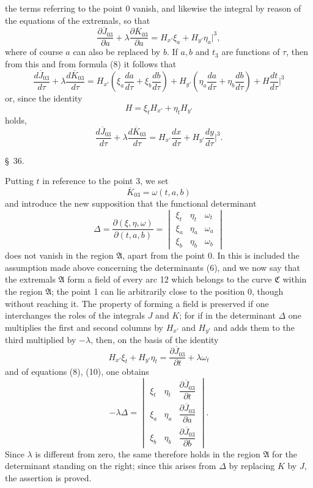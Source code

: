 \documentclass[11pt,a4paper,leqno]{article}
\begin{document}
the terms referring to the point 0 vanish, and likewise the integral by reason of the equations of the extremals, so that
\begin{equation}\tag{10}
\frac{\partial\overline{J}_{03}}{\partial a}+\lambda\frac{\partial\overline{K}_{03}}{\partial a}
=H_{x'}\xi_a+H_{y'}\eta_a\bigg|^3,
\end{equation}
where of course $a$ can also be replaced by $b$. If $a,b$ and $t_3$ are functions of $\tau$, then from this and from formula (8) it follows that
\[
\frac{d\overline{J}_{03}}{d\tau}+\lambda\frac{d\overline{K}_{03}}{d\tau}
=H_{x'}\left(\xi_a\frac{da}{d\tau}+\xi_b\frac{db}{d\tau}\right)
+H_{y'}\left(\eta_a\frac{da}{d\tau}+\eta_b\frac{db}{d\tau}\right)+H\frac{dt}{d\tau}\bigg|^3
\]
or, since the identity
\[
H=\xi_tH_{x'}+\eta_tH_{y'}
\]
holds,
\begin{equation}\tag{11}
\frac{d\overline{J}_{03}}{d\tau}+\lambda\frac{d\overline{K}_{03}}{d\tau}
=H_{x'}\frac{dx}{d\tau}+H_{y'}\frac{dy}{d\tau}\bigg|^3.
\end{equation}

\begin{center}{\large \S~36.}\end{center}

Putting $t$ in reference to the point 3, we set
\[
\overline{K}_{03}=\omega(t,a,b)
\]
and introduce the new supposition that the functional determinant
\begingroup
\setlength{\arraycolsep}{1pt}
\[
\Delta=\frac{\partial(\xi,\eta,\omega)}{\partial(t,a,b)}=
\begin{vmatrix}
\xi_t&\eta_t&\omega_t\\
\xi_a&\eta_a&\omega_a\\
\xi_b&\eta_b&\omega_b
\end{vmatrix}
\]
does not vanish in the region $\mathfrak{A}$, apart from the point 0. In this is included the assumption made above concerning the determinants (6), and we now say that the extremals $\mathfrak{A}$ form a field of every arc 12 which belongs to the curve $\mathfrak{C}$ within the region $\mathfrak{A}$; the point 1 can lie arbitrarily close to the position 0, though without reaching it. The property of forming a field is preserved if one interchanges the roles of the integrals $J$ and $K$; for if in the determinant $\Delta$ one multiplies the first and second columns by $H_{x'}$ and $H_{y'}$ and adds them to the third multiplied by $-\lambda$, then, on the basis of the identity
\[
H_{x'}\xi_t+H_{y'}\eta_t=\frac{\partial\overline{J}_{03}}{\partial t}+\lambda\omega_t
\]
and of equations (8), (10), one obtains
\[
-\lambda\Delta=
\begin{vmatrix}
\xi_t&\eta_t&\dfrac{\partial\overline{J}_{03}}{\partial t}\\[1.2ex]
\xi_a&\eta_a&\dfrac{\partial\overline{J}_{03}}{\partial a}\\[1.2ex]
\xi_b&\eta_b&\dfrac{\partial\overline{J}_{03}}{\partial b}
\end{vmatrix}.
\]
\endgroup
Since $\lambda$ is different from zero, the same therefore holds in the region $\mathfrak{A}$ for the determinant standing on the right; since this arises from $\Delta$ by replacing $K$ by $J$, the assertion is proved.
\end{document}
